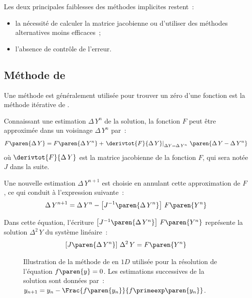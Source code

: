 \documentclass[rectoverso,pleiades,pstricks,leqno,anti]{texmf/note_technique_2010}
\begin{document}
Les deux principales faiblesses des méthodes implicites restent~:
\begin{itemize}
  \item la nécessité de calculer la matrice jacobienne ou d'utiliser des
  méthodes alternatives moins efficaces~;
  \item l'absence de contrôle de l'erreur.
\end{itemize}

\subsection{Méthode de }
\label{sec:NR}

Une méthode est généralement utilisée pour trouver un zéro d'une
fonction est la méthode itérative de .

Connaissant une estimation \(\Delta\,Y^{n}\) de la solution, la fonction
\(F\) peut être approximée dans un voisinage \(\Delta\,Y^{n}\) par~:
\[
F\paren{\Delta\,Y}=F\paren{\Delta\,Y^{n}}+\left.\derivtot{F}{\Delta\,Y}\right|_{\Delta
 Y=\Delta\,Y^{n}}\,\paren{\Delta\,Y-\Delta\,Y^{n}}
\]
où \(\derivtot{F}{\Delta\,Y}\) est la matrice jacobienne de la fonction
\(F\), qui sera notée \(J\) dans la suite.

Une nouvelle estimation \(\Delta\,Y^{n+1}\) est choisie en annulant
cette approximation de \(F\), ce qui conduit à l'expression suivante~:
\begin{equation}
  \label{eq:NR}
  \Delta\, Y^{n+1}=\Delta\,Y^{n}-\left[J^{-1}\paren{\Delta\,Y^{n}}\right]\,F\paren{Y^{n}}
\end{equation}

Dans cette équation, l'écriture \(\left[J^{-1}\paren{\Delta\,Y^{n}}\right]\,F\paren{Y^{n}}\) représente la
solution \(\Delta^{2}\,Y\) du système linéaire~:
\[
\left[J\paren{\Delta\,Y^{n}}\right]\,\Delta^{2}\,Y = F\paren{Y^{n}}
\]

\begin{figure}[htbp]
  \centering 
  
  \caption[Illustration de la méthode de  en $1D$ utilisée
  pour la résolution de l'équation $f\paren{y}=0$.]{Illustration de la
    méthode de  en $1D$ utilisée pour la résolution de
    l'équation $f\paren{y}=0$. Les estimations successives de la
    solution sont données par~:
    $y_{n+1}=y_{n}-\Frac{f\paren{y_{n}}}{f\primeexp\paren{y_{n}}}$.}
  \label{fig:illustration_newton_raphson}
\end{figure}
\end{document}

